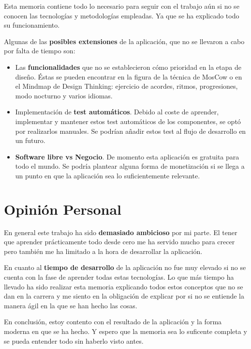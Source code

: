 \documentclass[12pt,twoside,titlepage]{report}
\newcommand\blankpage{%
    \newpage
    \null
    \thispagestyle{empty}%
    \newpage}
\begin{document}
{Esta memoria contiene todo lo necesario para seguir con el trabajo aún si no se conocen las tecnologías y metodologías empleadas. Ya que se ha explicado todo su funcionamiento.

Algunas de las \textbf{posibles extensiones} de la aplicación, que no se llevaron a cabo por falta de tiempo son:

\begin{itemize}
    \item Las \textbf{funcionalidades} que no se establecieron cómo prioridad en la etapa de diseño. Éstas se pueden encontrar en la figura de la técnica de MosCow o en el Mindmap de Design Thinking: ejercicio de acordes, ritmos, progresiones, modo nocturno y varios idiomas.
    \item Implementación de \textbf{test automáticos}. Debido al coste de aprender, implementar y mantener estos test automáticos de los componentes, se optó por realizarlos manuales. Se podrían añadir estos test al flujo de desarrollo en un futuro.
    \item \textbf{Software libre vs Negocio}. De momento esta aplicación es gratuita para todo el mundo. Se podría plantear alguna forma de monetización si se llega a un punto en que la aplicación sea lo suficientemente relevante.
\end{itemize}

\section{Opinión Personal}
En general este trabajo ha sido \textbf{demasiado ambicioso} por mi parte. El tener que aprender prácticamente todo desde cero me ha servido mucho para crecer pero también me ha limitado a la hora de desarrollar la aplicación.

En cuanto al \textbf{tiempo de desarrollo} de la aplicación no fue muy elevado si no se cuenta con la fase de aprender todas estas tecnologías. Lo que más tiempo ha llevado ha sido realizar esta memoria explicando todos estos conceptos que no se dan en la carrera y me siento en la obligación de explicar por si no se entiende la manera ágil en la que se han hecho las cosas.

En conclusión, estoy contento con el resultado de la aplicación y la forma moderna en que se ha hecho. Y espero que la memoria sea lo suficente completa y se pueda entender todo sin haberlo visto antes.

\blankpage



}
\end{document}
